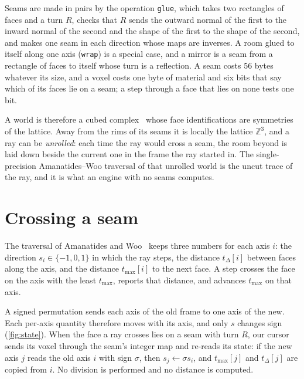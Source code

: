 \documentclass[10pt,a4paper]{article}
\newcommand{\code}[1]{\texttt{#1}}
\newcommand{\tmax}{t_{\max}}
\newcommand{\tdelta}{t_{\Delta}}
\begin{document}
Seams are made in pairs by the operation \code{glue}, which takes two rectangles of faces and a
turn $R$, checks that $R$ sends the outward normal of the first to the inward normal of the second and the
shape of the first to the shape of the second, and makes one seam in each direction whose maps
are inverses. A room glued to itself along one axis (\code{wrap}) is a special case, and a mirror
is a seam from a rectangle of faces to itself whose turn is a reflection. A seam costs 56 bytes
whatever its size, and a voxel costs one byte of material and six bits that say which of its
faces lie on a seam; a step through a face that lies on none tests one bit.

A world is therefore a cubed complex~\cite{gromov1987,bridson1999} whose face identifications
are symmetries of the lattice. Away from the rims of its seams it is locally the lattice
$\mathbb{Z}^3$, and a ray can be \emph{unrolled}: each time the ray would cross a seam, the room
beyond is laid down beside the current one in the frame the ray started in. The
single-precision Amanatides--Woo traversal of that unrolled world is the uncut trace of the
ray, and it is what an engine with no seams computes.

\section{Crossing a seam}
\label{sec:traversal}

The traversal of Amanatides and Woo~\cite{amanatides1987} keeps three numbers for each axis $i$:
the direction $s_i \in \{-1, 0, 1\}$ in which the ray steps, the distance $\tdelta[i]$ between
faces along the axis, and the distance $\tmax[i]$ to the next face. A step crosses the face on
the axis with the least $\tmax$, reports that distance, and advances $\tmax$ on that axis.

A signed permutation sends each axis of the old frame to one axis of the new. Each per-axis
quantity therefore moves with its axis, and only $s$ changes sign (\cref{fig:state}). When the
face a ray crosses lies on a seam with turn $R$, our cursor sends its voxel through the seam's
integer map and re-reads its state: if the new axis $j$ reads the old axis $i$ with sign
$\sigma$, then $s_j \leftarrow \sigma s_i$, and $\tmax[j]$ and $\tdelta[j]$ are copied from $i$.
No division is performed and no distance is computed.
\end{document}
